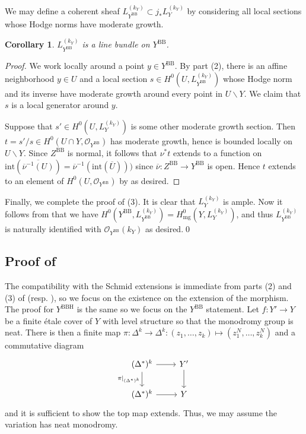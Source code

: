 \documentclass{amsart}
\newcommand{\bs}{\backslash}
\newcommand{\ol}{\overline}
\newtheorem{cor}[theorem]{Corollary}
\theoremstyle{definition}
\theoremstyle{remark}
\def\cO{\mathcal{O}}
\def\BB{\mathrm{BB}}
\def\bdd{\mathrm{mg}}
\renewcommand{\bar}[1]{\ol{#1}}
\def\BBH{\mathrm{BBH}}
\numberwithin{equation}{section}
\begin{document}
We may define a coherent sheaf $L_{Y^{\BB}}^{(k_Y)}\subset j_*L_{Y}^{(k_Y)}$ by considering all local sections whose Hodge norms have moderate growth.

\begin{cor}\label{cor:kypowergriffiths}
 $L_{Y^{\BB}}^{(k_Y)}$ is a line bundle on $Y^{\BB}$.
\end{cor}

\begin{proof}

We work locally around a point $y\in Y^{\BB}$. By part (2), there is an affine neighborhood $y\in U$ and a local section $s\in H^0(U,L_{Y^{\BB}}^{(k_Y)})$ whose Hodge norm and its inverse have moderate growth around every point in $U\bs Y$. We claim that $s$ is a local generator around $y$. 

Suppose that $s'\in H^0(U,L_{Y}^{(k_Y)})$ is some other moderate growth section. Then $t=s'/s\in H^0(U\cap Y,\cO_{Y^\BB})$ has moderate growth, hence is bounded locally on $U\bs Y$. Since $Z^\BB$ is normal, it follows that $\nu^*t$ extends to a function on $\mathrm{int}\left(\ol{\bar\nu^{-1}(U)}\right)=\bar\nu^{-1}(\mathrm{int}(\ol{U})))$ since $\bar\nu:Z^\BB\to Y^{\BB}$ is open.  Hence $t$ extends to an element of $H^0(U,\cO_{Y^{\BB}})$ by  as desired.
\end{proof}

Finally, we complete the proof of (3). It is clear that $L_Y^{(k_Y)}$ is ample. Now it follows from  that we have $H^0(Y^{\BB},L_{Y^{\BB}}^{(k_Y)}) = H^0_{\bdd}(Y,L_{Y}^{(k_Y)})$, and thus $L_{Y^{\BB}}^{(k_Y)}$ is naturally identified with $\cO_{Y^{\BB}}(k_Y)$ as desired.\qed
    


\subsection{Proof of }
The compatibility with the Schmid extensions is immediate from parts (2) and (3) of  (resp. ), so we focus on the existence on the extension of the morphism.  The proof for $Y^\BBH$ is the same so we focus on the $Y^\BB$ statement.  Let $f:Y'\to Y$ be a finite \'etale cover of $Y$ with level structure so that the monodromy group is neat. There is then a finite map $\pi:\Delta^k\to\Delta^k:(z_1,\ldots,z_k)\mapsto(z_1^N,\ldots,z_k^N)$ and a commutative diagram
\[\begin{tikzcd}
(\Delta^*)^k\ar[r]\ar[d,swap,"\pi|_{(\Delta^*)^k}"]& Y'\ar[d]\\
(\Delta^*)^k\ar[r]&Y
\end{tikzcd}\]
and it is sufficient to show the top map extends.  Thus, we may assume the variation has neat monodromy.
\end{document}
